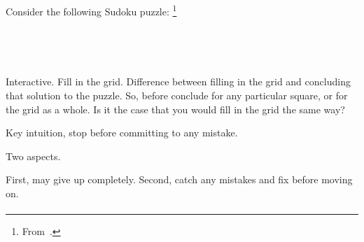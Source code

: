\begin{note}
  \begin{illustration}[Sudoku]
    \label{illu:gist:sudoku}
    Consider the following Sudoku puzzle:%
    \footnote{
      From~\textcite[84]{Coussement:2007up}.
    }
    \vspace{\baselineskip}

    \mbox{ }\hfill%
    \begin{adjustbox}{minipage=0.45\linewidth,scale=1}
      \centering
    \end{adjustbox}%
    \hfill\mbox{ }

  \end{illustration}

  Interactive.
  Fill in the grid.
  Difference between filling in the grid and concluding that solution to the puzzle.
  So, before conclude for any particular square, or for the grid as a whole.
  Is it the case that you would fill in the grid the same way?

  Key intuition, stop before committing to any mistake.

  Two aspects.

  First, may give up completely.
  Second, catch any mistakes and fix before moving on.
\end{note}

\paragraph{}

